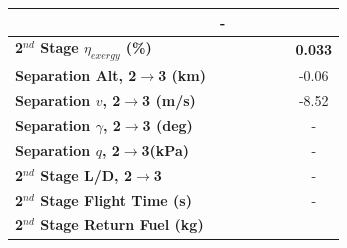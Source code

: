 \begin{table}[ht]
\begin{tabular}{l c c c c c c}
	& -
	\\
	\hline 
	\textbf{2$^{nd}$ Stage $\eta_{exergy}$ (\%)}
	& \textbf{\secondExergyEffmSPARTANNinetyFive}
	& \textbf{\secondExergyEffmSPARTANNinetySevenFive}
	& \textbf{\secondExergyEffmSPARTANStandard}
	& \textbf{\secondExergyEffmSPARTANOneHundredTwoFive}
	& \textbf{\secondExergyEffmSPARTANOneHundredFive}
	& \textbf{0.033}
	\\
	\textbf{Separation Alt, 2$\rightarrow$3 (km)}
	& \secondthirdSeparationAltmSPARTANNinetyFive
	& \secondthirdSeparationAltmSPARTANNinetySevenFive
	& \secondthirdSeparationAltmSPARTANStandard
	& \secondthirdSeparationAltmSPARTANOneHundredTwoFive
	& \secondthirdSeparationAltmSPARTANOneHundredFive
	&-0.06
	\\
	\textbf{Separation $v$, 2$\rightarrow$3 (m/s)}
	& \secondthirdSeparationvmSPARTANNinetyFive
	& \secondthirdSeparationvmSPARTANNinetySevenFive
	& \secondthirdSeparationvmSPARTANStandard
	& \secondthirdSeparationvmSPARTANOneHundredTwoFive
	& \secondthirdSeparationvmSPARTANOneHundredFive
	&-8.52
	\\
	\textbf{Separation $\gamma$, 2$\rightarrow$3 (deg)}
	& \secondthirdSeparationgammamSPARTANNinetyFive
	& \secondthirdSeparationgammamSPARTANNinetySevenFive
	& \secondthirdSeparationgammamSPARTANStandard
	& \secondthirdSeparationgammamSPARTANOneHundredTwoFive
	& \secondthirdSeparationgammamSPARTANOneHundredFive
	& -
	\\
	\textbf{Separation $q$, 2$\rightarrow$3(kPa)}
	& \secondthirdSeparationqmSPARTANNinetyFive
	& \secondthirdSeparationqmSPARTANNinetySevenFive
	& \secondthirdSeparationqmSPARTANStandard
	& \secondthirdSeparationqmSPARTANOneHundredTwoFive
	& \secondthirdSeparationqmSPARTANOneHundredFive
	& -
	\\
	\textbf{2$^{nd}$ Stage L/D, 2$\rightarrow$3}
	& \secondthirdSeparationLDmSPARTANNinetyFive
	& \secondthirdSeparationLDmSPARTANNinetySevenFive
	& \secondthirdSeparationLDmSPARTANStandard
	& \secondthirdSeparationLDmSPARTANOneHundredTwoFive
	& \secondthirdSeparationLDmSPARTANOneHundredFive
	& -
	\\
	\textbf{2$^{nd}$ Stage Flight Time (s)}
	& \secondFlightTimemSPARTANNinetyFive
	& \secondFlightTimemSPARTANNinetySevenFive
	& \secondFlightTimemSPARTANStandard
	& \secondFlightTimemSPARTANOneHundredTwoFive
	& \secondFlightTimemSPARTANOneHundredFive
	& -
	\\
	\textbf{2$^{nd}$ Stage Return Fuel (kg)}
	& \returnFuelmSPARTANNinetyFive
	& \returnFuelmSPARTANNinetySevenFive
	& \returnFuelmSPARTANStandard
	& \returnFuelmSPARTANOneHundredTwoFive

\end{tabular}
\end{table}
